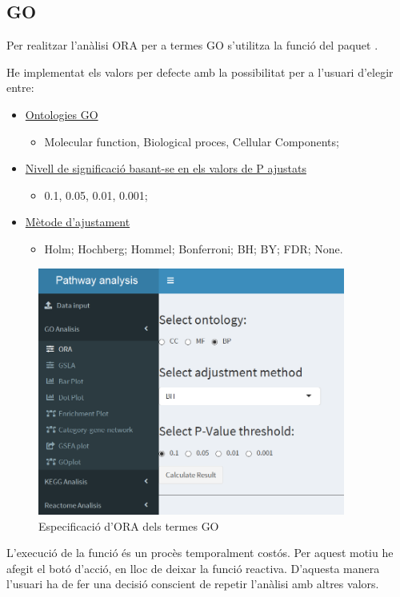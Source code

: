 \subsection{GO}

Per realitzar l'anàlisi ORA per a termes GO s'utilitza la funció  del paquet .

He implementat els valors per defecte amb la possibilitat per a l’usuari d'elegir entre:

\begin{itemize}
\item \underline{Ontologies GO} 
\begin{itemize}
\item Molecular function, Biological proces, Cellular Components;
\end{itemize}
\item \underline{Nivell de significació basant-se en els valors de P ajustats}
\begin{itemize}
\item 0.1, 0.05, 0.01, 0.001;
\end{itemize}
\item \underline{Mètode d'ajustament}
\begin{itemize}
\item Holm; Hochberg; Hommel; Bonferroni; BH; BY; FDR; None.
\end{itemize}
\end{itemize}

\begin{figure}[h!]
\includegraphics[width=0.9\textwidth]{figures/App_F5_Items_GO_ORA.png}
\caption{Especificació d'ORA dels termes GO}
\end{figure}
L'execució de la funció és un procès temporalment costós. Per aquest motiu he afegit el botó d'acció, en lloc de deixar la funció reactiva. D'aquesta manera l'usuari ha de fer una decisió conscient de repetir l'anàlisi amb altres valors.

